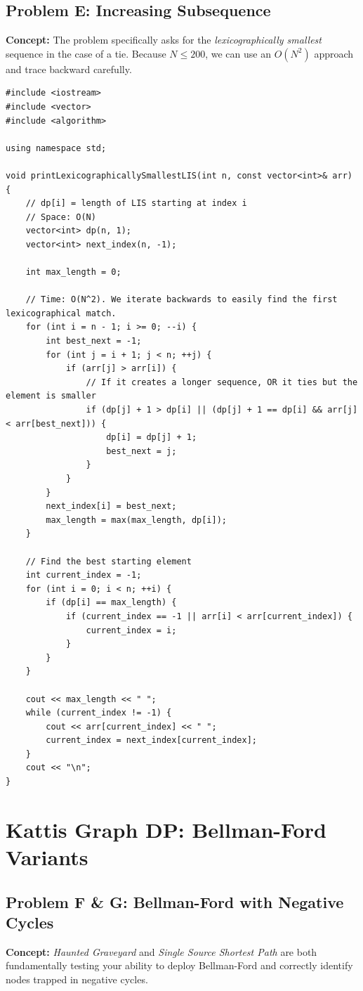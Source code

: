 \subsection{Problem E: Increasing Subsequence}
\textbf{Concept:} The problem specifically asks for the \textit{lexicographically smallest} sequence in the case of a tie. Because $N \le 200$, we can use an $O(N^2)$ approach and trace backward carefully.

\begin{lstlisting}
#include <iostream>
#include <vector>
#include <algorithm>

using namespace std;

void printLexicographicallySmallestLIS(int n, const vector<int>& arr) {
    // dp[i] = length of LIS starting at index i
    // Space: O(N)
    vector<int> dp(n, 1);
    vector<int> next_index(n, -1);
    
    int max_length = 0;
    
    // Time: O(N^2). We iterate backwards to easily find the first lexicographical match.
    for (int i = n - 1; i >= 0; --i) {
        int best_next = -1;
        for (int j = i + 1; j < n; ++j) {
            if (arr[j] > arr[i]) {
                // If it creates a longer sequence, OR it ties but the element is smaller
                if (dp[j] + 1 > dp[i] || (dp[j] + 1 == dp[i] && arr[j] < arr[best_next])) {
                    dp[i] = dp[j] + 1;
                    best_next = j;
                }
            }
        }
        next_index[i] = best_next;
        max_length = max(max_length, dp[i]);
    }
    
    // Find the best starting element
    int current_index = -1;
    for (int i = 0; i < n; ++i) {
        if (dp[i] == max_length) {
            if (current_index == -1 || arr[i] < arr[current_index]) {
                current_index = i;
            }
        }
    }
    
    cout << max_length << " ";
    while (current_index != -1) {
        cout << arr[current_index] << " ";
        current_index = next_index[current_index];
    }
    cout << "\n";
}
\end{lstlisting}

\section{Kattis Graph DP: Bellman-Ford Variants}

\subsection{Problem F \& G: Bellman-Ford with Negative Cycles}
\textbf{Concept:} \textit{Haunted Graveyard} and \textit{Single Source Shortest Path} are both fundamentally testing your ability to deploy Bellman-Ford and correctly identify nodes trapped in negative cycles.

